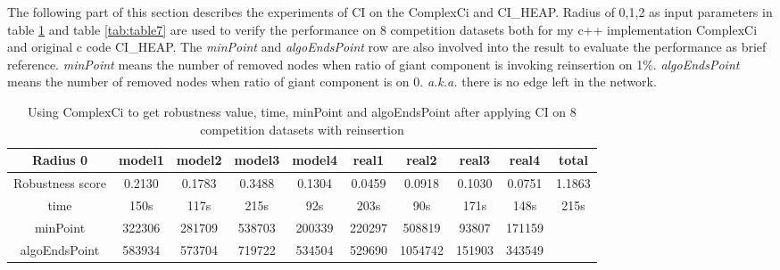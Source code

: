 \documentclass{article}
\begin{document}
	The following part of this section describes the experiments of CI on the ComplexCi and CI\_HEAP. Radius of 0,1,2 as input parameters in table \ref{tab:table6} and table \ref{tab:table7} are used to verify the performance on 8 competition datasets both for my c++ implementation ComplexCi and original c code CI\_HEAP. The \textit{minPoint} and \textit{algoEndsPoint} row are also involved into the result to evaluate the performance as brief reference. \textit{minPoint} means the number of removed nodes when ratio of giant component is invoking reinsertion on 1\%. \textit{algoEndsPoint} means the number of removed nodes when ratio of giant component is on 0. \textit{a.k.a.} there is no edge left in the network.
	
		
	
	\begin{table}[]
		\begin{adjustwidth}{-1cm}{}		
		\begin{threeparttable}		
		\centering
		\caption{Using ComplexCi to get robustness value, time, minPoint and algoEndsPoint after applying CI on 8 competition datasets with reinsertion}
		\label{tab:table6}
		\begin{tabular}{|c|c|c|c|c|c|c|c|c|c|}
			\hline
			\textbf{Radius 0} & \textbf{model1} & \textbf{model2} & \textbf{model3} & \textbf{model4} & \textbf{real1} & \textbf{real2} & \textbf{real3} & \textbf{real4} & \textbf{total} \\ \hline
			Robustness score                   & 0.2130          & 0.1783          & 0.3488          & 0.1304          & 0.0459         & 0.0918         & 0.1030         & 0.0751         & 1.1863         \\ \hline
			time                    & 150s            & 117s            & 215s            & 92s             & 203s           & 90s            & 171s           & 148s           & 215s           \\ \hline
			minPoint                & 322306          & 281709          & 538703          & 200339          & 220297         & 508819         & 93807          & 171159         &                \\ \hline
			algoEndsPoint           & 583934          & 573704          & 719722          & 534504          & 529690         & 1054742        & 151903         & 343549         &                \\ \hline
			

\end{tabular}
\end{threeparttable}
\end{adjustwidth}
\end{table}
\end{document}
